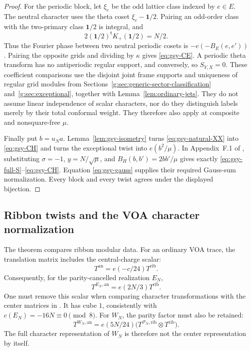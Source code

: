 \documentclass[11pt,a4paper]{article}
\numberwithin{equation}{section}
\theoremstyle{definition}\newtheorem{definition}[theorem]{Definition}
\theoremstyle{remark}\newtheorem{remark}[theorem]{Remark}
\begin{document}
\begin{proof}
For the periodic block, let $\xi_e$ be the odd lattice class
indexed by $e\in E$. The neutral character uses the theta coset
$\xi_e-\mathbf1/2$. Pairing an odd-order class with the
two-primary class $\mathbf1/2$ is integral, and
\[
 2(\mathbf1/2)^{\mathsf t}K_+(\mathbf1/2)=N/2.
\]
Thus the Fourier phase between two neutral periodic cosets is
$-e(-B_E(e,e'))$. Pairing the opposite grids and dividing by
$\kappa$ gives \eqref{eq:gsy-CE}. A periodic theta transform has
no antiperiodic regular support, and conversely, so $S_{Y,X}=0$.
These coefficient comparisons use the disjoint joint frame
supports and uniqueness of regular grid modules from
Sections~\ref{g:sec:generic-sector-classification}
and~\ref{g:sec:exceptional}, together with
Lemma~\ref{lem:ordinary-jets}. They do not assume linear
independence of scalar characters, nor do they distinguish labels
merely by their total conformal weight. They therefore also apply
at composite and nonsquare-free $\mu$.

Finally put $b=u_Na$. Lemma~\ref{lem:gsy-isometry} turns
\eqref{eq:gsy-natural-XX} into \eqref{eq:gsy-CH} and turns the
exceptional twist into $e(b^2/\mu)$. In Appendix~F.1 of \cite{gsy},
substituting $\sigma=-1$, $y=N/\sqrt\mu$, and
$B_H(b,b')=2bb'/\mu$ gives exactly
\eqref{eq:gsy-full-S}--\eqref{eq:gsy-CH}. Equation
\eqref{eq:gsy-gauss} supplies their required Gauss-sum normalization.
Every block and every twist agrees under the displayed bijection.
\end{proof}

\subsection{Ribbon twists and the VOA character normalization}

The theorem compares ribbon modular data. For an ordinary VOA trace,
the translation matrix includes the central-charge scalar:
\[
              T^{\mathrm{an}}=e(-c/24)T^{\mathrm{rib}}.
\]
Consequently, for the parity-cancelled realization $E_N$,
\[
              T^{E_N,\mathrm{an}}=e(2N/3)T^{\mathrm{rib}}.
\]
One must remove this scalar when comparing character transformations
with the center matrices in \cite{gsy}. It has cube $1$, consistently
with $c(E_N)=-16N\equiv0\pmod8$.
For $W_N$, the parity factor must also be retained:
\[
 T^{W_N,\mathrm{an}}
   =e(5N/24)\bigl(T^{\mathcal P_N,\mathrm{rib}}
                          \otimes T^{\mathrm{rib}}\bigr).
\]
The full character representation of $W_N$ is therefore not the
center representation by itself.
\end{document}
